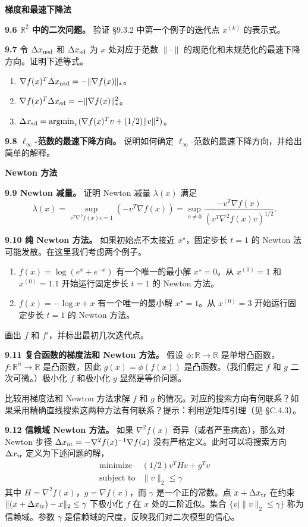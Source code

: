 \documentclass[UTF8, 12pt, fontset=fandol, oneside]{ctexart}
\begin{document}
\noindent\textbf{梯度和最速下降法}

\noindent\textbf{9.6 $\mathbb{R}^2$ 中的二次问题。}\quad
验证 \S9.3.2 中第一个例子的迭代点 $x^{(k)}$ 的表示式。

\noindent\textbf{9.7}\quad
令 $\Delta x_{\rm nsd}$ 和 $\Delta x_{\rm sd}$ 为 $x$ 处对应于范数 $\|\cdot\|$ 的规范化和未规范化的最速下降方向。证明下述等式。
\begin{enumerate}
\item[(a)] $\nabla f(x)^T\Delta x_{\rm nsd}=-\|\nabla f(x)\|_\ast$。
\item[(b)] $\nabla f(x)^T\Delta x_{\rm sd}=-\|\nabla f(x)\|_\ast^2$。
\item[(c)] $\Delta x_{\rm sd}=\operatorname*{argmin}_v(\nabla f(x)^Tv+(1/2)\|v\|^2)$。
\end{enumerate}

\noindent\textbf{9.8 $\ell_\infty$-范数的最速下降方向。}\quad
说明如何确定 $\ell_\infty$-范数的最速下降方向，并给出简单的解释。

\noindent\textbf{Newton 方法}

\noindent\textbf{9.9 Newton 减量。}\quad
证明 Newton 减量 $\lambda(x)$ 满足
\[
\lambda(x)=\sup_{v^T\nabla^2 f(x)v=1}(-v^T\nabla f(x))
=\sup_{v\neq0}\frac{-v^T\nabla f(x)}{(v^T\nabla^2 f(x)v)^{1/2}}.
\]

\noindent\textbf{9.10 纯 Newton 方法。}\quad
如果初始点不太接近 $x^\star$，固定步长 $t=1$ 的 Newton 法可能发散。在这里我们考虑两个例子。
\begin{enumerate}
\item[(a)] $f(x)=\log(e^x+e^{-x})$ 有一个唯一的最小解 $x^\star=0$。从 $x^{(0)}=1$ 和 $x^{(0)}=1.1$ 开始运行固定步长 $t=1$ 的 Newton 方法。
\item[(b)] $f(x)=-\log x+x$ 有一个唯一的最小解 $x^\star=1$。从 $x^{(0)}=3$ 开始运行固定步长 $t=1$ 的 Newton 方法。
\end{enumerate}
画出 $f$ 和 $f'$，并标出最初几次迭代点。

\noindent\textbf{9.11 复合函数的梯度法和 Newton 方法。}\quad
假设 $\phi:\mathbb{R}\to\mathbb{R}$ 是单增凸函数，$f:\mathbb{R}^n\to\mathbb{R}$ 是凸函数，因此 $g(x)=\phi(f(x))$ 是凸函数。（我们假定 $f$ 和 $g$ 二次可微。）极小化 $f$ 和极小化 $g$ 显然是等价问题。

比较用梯度法和 Newton 方法求解 $f$ 和 $g$ 的情况。对应的搜索方向有何联系？如果采用精确直线搜索这两种方法有何联系？提示：利用逆矩阵引理（见 \S C.4.3）。

\noindent\textbf{9.12 信赖域 Newton 方法。}\quad
如果 $\nabla^2 f(x)$ 奇异（或者严重病态），那么对 Newton 步径 $\Delta x_{\rm nt}=-\nabla^2 f(x)^{-1}\nabla f(x)$ 没有严格定义。此时可以将搜索方向 $\Delta x_{\rm tr}$ 定义为下述问题的解，
\[
\begin{array}{ll}
\mbox{minimize} & (1/2)v^THv+g^Tv\\
\mbox{subject to} & \|v\|_2\leq\gamma
\end{array}
\]
其中 $H=\nabla^2 f(x)$，$g=\nabla f(x)$，而 $\gamma$ 是一个正的常数。点 $x+\Delta x_{\rm tr}$ 在约束 $\|(x+\Delta x_{\rm tr})-x\|_2\leq\gamma$ 下极小化 $f$ 在 $x$ 处的二阶近似。集合 $\{v\mid \|v\|_2\leq\gamma\}$ 称为信赖域。参数 $\gamma$ 是信赖域的尺度，反映我们对二次模型的信心。
\end{document}
